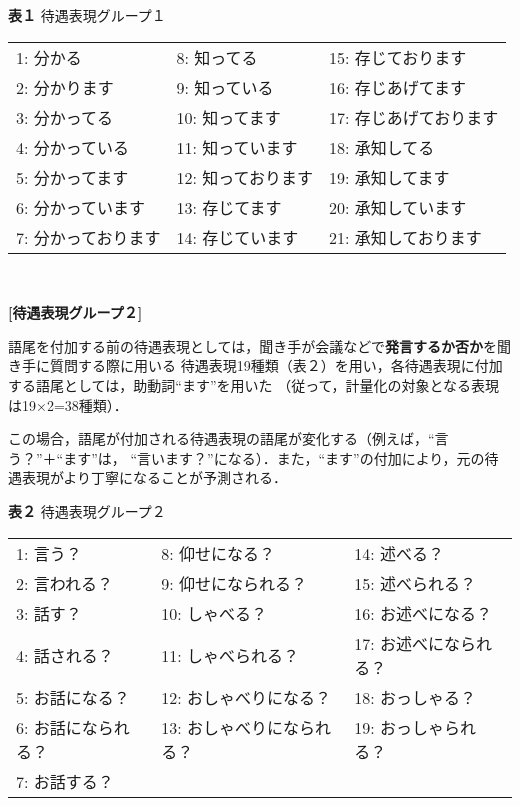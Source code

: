 \begin{center}
{\bf 表１} 待遇表現グループ１

\medskip

\begin{tabular}{|l l l|}\hline
1: 分かる & 8: 知ってる & 15: 存じております \\
2: 分かります & 9: 知っている & 16: 存じあげてます \\
3: 分かってる & 10: 知ってます & 17: 存じあげております \\
4: 分かっている & 11: 知っています & 18: 承知してる \\
5: 分かってます & 12: 知っております & 19: 承知してます \\
6: 分かっています & 13: 存じてます & 20: 承知しています \\
7: 分かっております & 14: 存じています & 21: 承知しております \\ \hline
\end{tabular}　
\end{center}

\bigskip

{\flushleft \bf [待遇表現グループ２]}

\bigskip

語尾を付加する前の待遇表現としては，聞き手が会議などで{\bf 発言するか否か}を聞き手に質問する際に用いる
待遇表現19種類（表２）を用い，各待遇表現に付加する語尾としては，助動詞``ます''を用いた
（従って，計量化の対象となる表現は19×2=38種類）．

この場合，語尾が付加される待遇表現の語尾が変化する（例えば，``言う？''＋``ます''は，
``言います？''になる）．また，``ます''の付加により，元の待遇表現がより丁寧になることが予測される．

\begin{center}
{\bf 表２} 待遇表現グループ２

\medskip

\begin{tabular}{|l l l|}\hline
1: 言う？ & 8: 仰せになる？ & 14: 述べる？\\
2: 言われる？ & 9: 仰せになられる？ & 15: 述べられる？\\
3: 話す？ & 10: しゃべる？ & 16: お述べになる？\\
4: 話される？ & 11: しゃべられる？ & 17: お述べになられる？\\
5: お話になる？ & 12: おしゃべりになる？ & 18: おっしゃる？\\
6: お話になられる？ & 13: おしゃべりになられる？ & 19: おっしゃられる？\\
7: お話する？ & & \\ \hline
\end{tabular}
\end{center}
